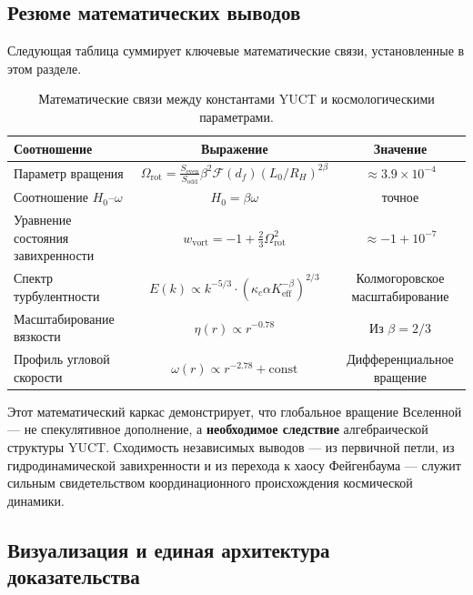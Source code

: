 \documentclass[11pt,a4paper]{article}
\begin{document}
	\subsection{Резюме математических выводов}
	
	Следующая таблица суммирует ключевые математические связи, установленные в этом разделе.
	
	\begin{table}[htbp]
		\centering
		\caption{Математические связи между константами YUCT и космологическими параметрами.}
		\label{tab:math-connections}
		\begin{tabular}{l c c}
			\toprule
			\textbf{Соотношение} & \textbf{Выражение} & \textbf{Значение} \\
			\midrule
			Параметр вращения & \(\Omega_{\mathrm{rot}} = \frac{S_{\mathrm{even}}}{S_{\mathrm{odd}}} \beta^2 \mathcal{F}(d_f) (L_0/R_H)^{2\beta}\) & \(\approx 3.9 \times 10^{-4}\) \\
			Соотношение \(H_0\)–\(\omega\) & \(H_0 = \beta \omega\) & точное \\
			Уравнение состояния завихренности & \(w_{\mathrm{vort}} = -1 + \frac{2}{3}\Omega_{\mathrm{rot}}^2\) & \(\approx -1 + 10^{-7}\) \\
			Спектр турбулентности & \(E(k) \propto k^{-5/3} \cdot (\kappa_c \alpha K_{\mathrm{eff}}^{-\beta})^{2/3}\) & Колмогоровское масштабирование \\
			Масштабирование вязкости & \(\eta(r) \propto r^{-0.78}\) & Из \(\beta = 2/3\) \\
			Профиль угловой скорости & \(\omega(r) \propto r^{-2.78} + \text{const}\) & Дифференциальное вращение \\
			\bottomrule
		\end{tabular}
	\end{table}
	
	Этот математический каркас демонстрирует, что глобальное вращение Вселенной — не спекулятивное дополнение, а \textbf{необходимое следствие} алгебраической структуры YUCT. Сходимость независимых выводов — из первичной петли, из гидродинамической завихренности и из перехода к хаосу Фейгенбаума — служит сильным свидетельством координационного происхождения космической динамики.
	
	\subsection{Визуализация и единая архитектура доказательства}
	\label{subsec:visualization}
	
\end{document}

